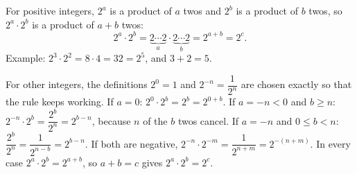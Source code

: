 For positive integers, $2^a$ is a product of $a$ twos and $2^b$ is a product of $b$ twos, so $2^a\cdot2^b$ is a product of $a+b$ twos:
\[
2^a\cdot2^b=\underbrace{2\cdots2}_{a}\cdot\underbrace{2\cdots2}_{b}=2^{a+b}=2^c .
\]
Example: $2^3\cdot2^2=8\cdot4=32=2^5$, and $3+2=5$.

For other integers, the definitions $2^0=1$ and $2^{-n}=\dfrac{1}{2^n}$ are chosen exactly so that the rule keeps working. If $a=0$: $2^0\cdot2^b=2^b=2^{0+b}$. If $a=-n<0$ and $b\ge n$: $2^{-n}\cdot2^b=\dfrac{2^b}{2^n}=2^{b-n}$, because $n$ of the $b$ twos cancel. If $a=-n$ and $0\le b<n$: $\dfrac{2^b}{2^n}=\dfrac{1}{2^{n-b}}=2^{b-n}$. If both are negative, $2^{-n}\cdot2^{-m}=\dfrac{1}{2^{n+m}}=2^{-(n+m)}$. In every case $2^a\cdot2^b=2^{a+b}$, so $a+b=c$ gives $\boxed{2^a\cdot2^b=2^c}$.
